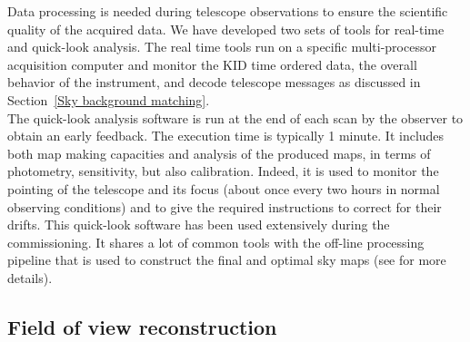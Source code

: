 \documentclass[]{aa} %
\begin{document}
Data processing is needed during telescope observations to ensure the scientific quality of the acquired data.
We have developed two sets of tools for real-time and quick-look analysis. The real time tools run on a specific multi-processor acquisition computer and monitor the KID time ordered data, the overall behavior of the instrument, and decode telescope messages as discussed in Section~\ref{Sky background matching}. \\

The quick-look analysis software is run at the end of each scan by the observer to obtain an early feedback. The execution time is typically 1 minute. It includes both map making capacities and analysis of the produced maps, in terms of photometry, sensitivity, but also calibration. Indeed, it is used to monitor the pointing of the telescope and its focus (about once every two hours in normal observing conditions) and to give the required instructions to correct for their drifts. This quick-look software has been used extensively during the commissioning. It shares a lot of common tools with the off-line processing pipeline that is used to construct the final and optimal sky maps (see \cite{ponthieu} for more details).

\subsection{Field of view reconstruction}
\end{document}
